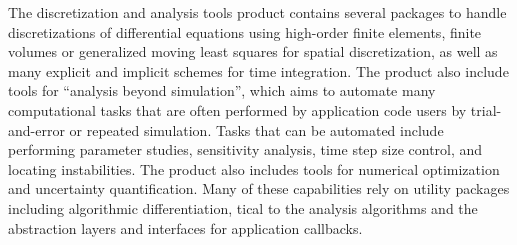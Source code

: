 The discretization and analysis tools product contains several packages to handle discretizations of differential equations using high-order finite elements, finite volumes or generalized moving least squares for spatial discretization, as well as many explicit and implicit schemes for time integration. The product also include tools for “analysis beyond simulation”, which aims to automate many computational tasks that are often performed by application code users by trial-and-error or repeated simulation. Tasks that can be automated include performing parameter studies, sensitivity analysis, time step size control, and locating instabilities. The product also includes tools for numerical optimization and uncertainty quantification. Many of these capabilities rely on utility packages including algorithmic differentiation, tical to the analysis algorithms and the abstraction layers and interfaces for application callbacks.


